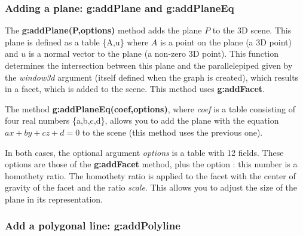 \subsubsection{Adding a plane: g:addPlane and g:addPlaneEq}

The \textbf{g:addPlane(P,options)} method adds the plane $P$ to the 3D scene. This plane is defined as a table \{A,u\} where $A$ is a point on the plane (a 3D point) and $u$ is a normal vector to the plane (a non-zero 3D point). This function determines the intersection between this plane and the parallelepiped given by the \emph{window3d} argument (itself defined when the graph is created), which results in a facet, which is added to the scene. This method uses \textbf{g:addFacet}.

The method \textbf{g:addPlaneEq(coef,options)}, where \emph{coef} is a table consisting of four real numbers \{a,b,c,d\}, allows you to add the plane with the equation $ax+by+cz+d=0$ to the scene (this method uses the previous one).

In both cases, the optional argument \emph{options} is a table with 12 fields. These options are those of the \textbf{g:addFacet} method, plus the option : this number is a homothety ratio. The homothety ratio is applied to the facet with the center of gravity of the facet and the ratio \emph{scale}. This allows you to adjust the size of the plane in its representation.

\subsubsection{Add a polygonal line: g:addPolyline}

